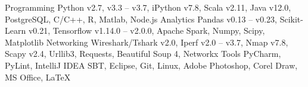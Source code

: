 

\begin{cvskills}

  \cvskill
    {Programming} %
    {Python v2.7, v3.3 -- v3.7, iPython v7.8, Scala v2.11, Java v12.0, PostgreSQL, C/C++, R, Matlab, Node.js} %
  \cvskill
    {Analytics} %
    {Pandas v0.13 -- v0.23, Scikit-Learn v0.21, Tensorflow v1.14.0 -- v2.0.0, Apache Spark, Numpy, Scipy, Matplotlib} %
  \cvskill
    {Networking} %
    {Wireshark/Tshark v2.0, Iperf v2.0 -- v3.7, Nmap v7.8, Scapy v2.4, Urllib3, Requests, Beautiful Soup 4, Networkx} %
  \cvskill
    {Tools} %
    {PyCharm, PyLint, IntelliJ IDEA SBT, Eclipse, Git, Linux, Adobe Photoshop, Corel Draw, MS Office, \LaTeX}
    

\end{cvskills}


